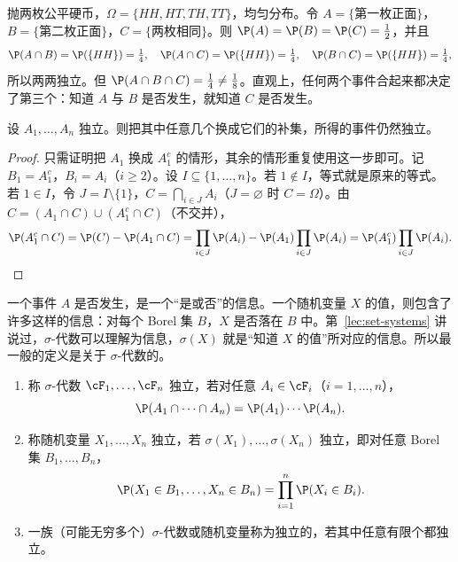 \begin{example}[两两独立但不相互独立]\label{ex:independence:pairwise}
抛两枚公平硬币，$\Omega=\{HH,HT,TH,TT\}$，均匀分布。令 $A=\{\text{第一枚正面}\}$，$B=\{\text{第二枚正面}\}$，$C=\{\text{两枚相同}\}$。则 $\P(A)=\P(B)=\P(C)=\frac12$，并且
\[
\P(A\cap B)=\P(\{HH\})=\tfrac14,\quad \P(A\cap C)=\P(\{HH\})=\tfrac14,\quad \P(B\cap C)=\P(\{HH\})=\tfrac14,
\]
所以两两独立。但 $\P(A\cap B\cap C)=\frac14\neq\frac18$。直观上，任何两个事件合起来都决定了第三个：知道 $A$ 与 $B$ 是否发生，就知道 $C$ 是否发生。
\end{example}

\begin{proposition}[补事件保持独立性]\label{prop:independence:complements}
设 $A_1,\dots,A_n$ 独立。则把其中任意几个换成它们的补集，所得的事件仍然独立。
\end{proposition}
\begin{proof}
只需证明把 $A_1$ 换成 $A_1^c$ 的情形，其余的情形重复使用这一步即可。记 $B_1=A_1^c$，$B_i=A_i$（$i\geqslant2$）。设 $I\subseteq\{1,\dots,n\}$。若 $1\notin I$，等式就是原来的等式。若 $1\in I$，令 $J=I\setminus\{1\}$，$C=\bigcap_{i\in J}A_i$（$J=\varnothing$ 时 $C=\Omega$）。由 $C=(A_1\cap C)\cup(A_1^c\cap C)$（不交并），
\[
\P(A_1^c\cap C)=\P(C)-\P(A_1\cap C)=\prod_{i\in J}\P(A_i)-\P(A_1)\prod_{i\in J}\P(A_i)=\P(A_1^c)\prod_{i\in J}\P(A_i).\qedhere
\]
\end{proof}


一个事件 $A$ 是否发生，是一个“是或否”的信息。一个随机变量 $X$ 的值，则包含了许多这样的信息：对每个 Borel 集 $B$，$X$ 是否落在 $B$ 中。第~\ref{lec:set-systems} 讲说过，$\sigma$-代数可以理解为信息，$\sigma(X)$ 就是“知道 $X$ 的值”所对应的信息。所以最一般的定义是关于 $\sigma$-代数的。

\begin{definition}\label{def:independence:sigma}
\begin{enumerate}
\item 称 $\sigma$-代数 $\cF_1,\dots,\cF_n$ 独立，若对任意 $A_i\in\cF_i$（$i=1,\dots,n$），
\[
\P(A_1\cap\cdots\cap A_n)=\P(A_1)\cdots \P(A_n).
\]
\item 称随机变量 $X_1,\dots,X_n$ 独立，若 $\sigma(X_1),\dots,\sigma(X_n)$ 独立，即对任意 Borel 集 $B_1,\dots,B_n$，
\[
\P(X_1\in B_1,\dots,X_n\in B_n)=\prod_{i=1}^n\P(X_i\in B_i).
\]
\item 一族（可能无穷多个）$\sigma$-代数或随机变量称为独立的，若其中任意有限个都独立。
\end{enumerate}
\end{definition}

